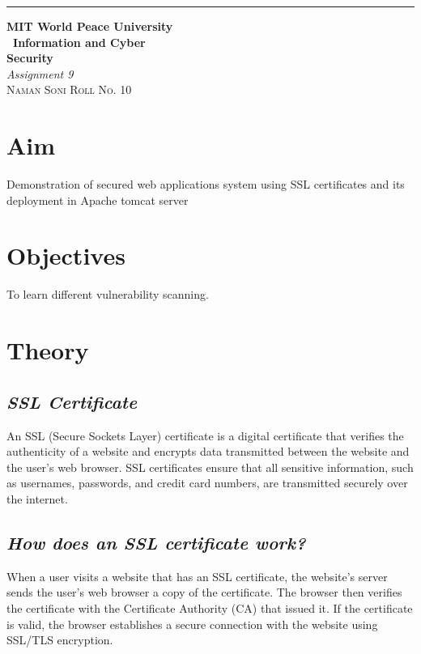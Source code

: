 \documentclass{article}
\begin{document}
	\begin{titlepage} %
	
	\raggedleft\rule{1pt}{\textheight} %
	\hspace{0.05\textwidth} %
	\parbox[b]{0.75\textwidth}
	{ %
		
		{\Huge\bfseries MIT World Peace University \\[0.5\baselineskip] \ Information and Cyber \\ Security}\\[2\baselineskip] %
		{\large\textit{Assignment 9}}\\[4\baselineskip] %
		{\Large\textsc{Naman Soni Roll No. 10}} %
		
		\vspace{0.5\textheight} %
	}
	
\end{titlepage}
\tableofcontents
\pagebreak
\section{\textbf{Aim}}
Demonstration of secured web applications system using SSL certificates and its deployment in
Apache tomcat server
\section{\textbf{Objectives}} 
To learn different vulnerability scanning.
\section{\textbf{Theory}}
\subsection{\textit{SSL Certificate}}
An SSL (Secure Sockets Layer) certificate is a digital certificate that verifies the authenticity of a website and encrypts data transmitted between the website and the user's web browser. SSL certificates ensure that all sensitive information, such as usernames, passwords, and credit card numbers, are transmitted securely over the internet.
\subsection{\textit{How does an SSL certificate work?}}
When a user visits a website that has an SSL certificate, the website's server sends the user's web browser a copy of the certificate. The browser then verifies the certificate with the Certificate Authority (CA) that issued it. If the certificate is valid, the browser establishes a secure connection with the website using SSL/TLS encryption.
\end{document}
